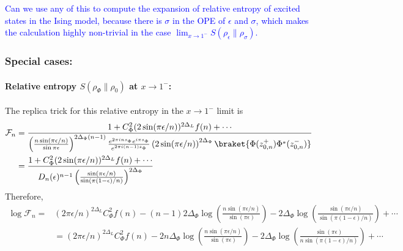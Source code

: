\documentclass[11pt]{article}
\newcommand{\ep}{\epsilon}
\newcommand{\nn}{\nonumber}
\newcommand{\lb}{\left(}
\newcommand{\rb}{\right)}
\newcommand{\NL}[1]{\textcolor{blue}{#1}}
\begin{document}
\NL{Can we use any of this to compute the expansion of relative entropy of excited states in the Ising model, because there is $\sigma$ in the OPE of $\epsilon$ and $\sigma$, which makes the calculation highly non-trivial in the case $\lim_{x\to 1^-}S(\rho_\epsilon\|\rho_\sigma)$.}

\subsubsection{Special cases:}
\paragraph{Relative entropy $S(\rho_\Phi\|\rho_0)$ at $x\to 1^-$:}
The replica trick for this relative entropy in the $x\to 1^-$ limit is
\begin{align}
  \mathcal{F}_n&=\frac{1+C_\Phi^2(2\sin(\pi \ep/n))^{2\Delta_L}f(n)+\cdots }{\lb \frac{n \sin (\pi \ep /n)}{\sin \pi \ep} \rb^{2\Delta_\Phi (n-1)}\frac{e^{2\pi i ns_\Phi}e^{i\pi s_\Phi}}{e^{2\pi i (n-1)s_\Phi}}
  \lb2\sin(\pi \ep/n)\rb^{2\Delta_\Phi}\braket{\Phi(z_{0,n}^+)\Phi^*(z_{0,n}^-)}} \nn \\
  &= \frac{1+C_\Phi^2(2\sin(\pi \ep/n))^{2\Delta_L}f(n)+\cdots }{D_n(\ep)^{n-1} \lb \frac{\sin(\pi \ep/n)}{\sin(\pi (1-\ep)/n)}\rb^{2\Delta_\Phi}
  }
\end{align}
Therefore,
\begin{align}
  \log\mathcal{F}_n=&(2\pi \ep/n)^{2\Delta_L}C_\Phi^2 f(n)-(n-1) 2\Delta_\Phi \log \lb \frac{n \sin (\pi \ep/n )}{\sin (\pi \ep)} \rb -2\Delta_\Phi\log\lb\frac{\sin(\pi \ep/n)}{\sin(\pi (1-\ep)/n)}\rb+\cdots\nn\\
  &=(2\pi \ep/n)^{2\Delta_L}C_\Phi^2 f(n)- 2n\Delta_\Phi \log \lb \frac{n \sin (\pi \ep/n )}{\sin (\pi \ep)} \rb -2\Delta_\Phi\log\lb\frac{\sin(\pi \ep)}{n\sin(\pi (1-\ep)/n)}\rb+\cdots
    \end{align}
\end{document}
